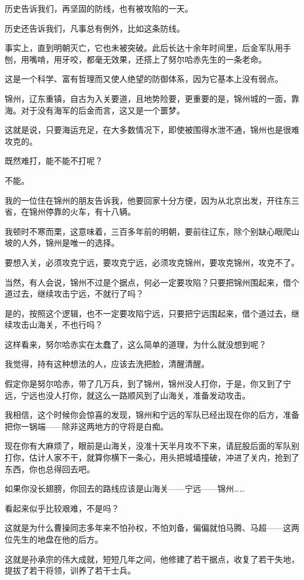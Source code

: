 \begin{multicols}{\theparacolNo}
历史告诉我们，再坚固的防线，也有被攻陷的一天。

历史还告诉我们，凡事总有例外，比如这条防线。

事实上，直到明朝灭亡，它也未被突破。此后长达十余年时间里，后金军队用手刨，用嘴啃，用牙咬，都毫无效果，还搭上了努尔哈赤先生的一条老命。

这是一个科学、富有哲理而又使人绝望的防御体系，因为它基本上没有弱点。

锦州，辽东重镇，自古为入关要道，且地势险要，更重要的是，锦州城的一面，靠海。对于没有海军的后金而言，这又是一个噩梦。

这就是说，只要海运充足，在大多数情况下，即使被围得水泄不通，锦州也是很难攻克的。

既然难打，能不能不打呢？

不能。

我的一位住在锦州的朋友告诉我，他要回家十分方便，因为从北京出发，开往东三省，在锦州停靠的火车，有十八辆。

我顿时不寒而栗，这意味着，三百多年前的明朝，要前往辽东，除个别缺心眼爬山坡的人外，锦州是唯一的选择。

要想入关，必须攻克宁远，要攻克宁远，必须攻克锦州，要攻克锦州，攻克不了。

当然，有人会说，锦州不过是个据点，何必一定要攻陷？只要把锦州围起来，借个道过去，继续攻击宁远，不就行了吗？

是的，按照这个逻辑，也不一定要攻陷宁远，只要把宁远围起来，借个道过去，继续攻击山海关，不也行吗？

这样看来，努尔哈赤实在太蠢了，这么简单的道理，为什么就没想到呢？

我觉得，持有这种想法的人，应该去洗把脸，清醒清醒。

假定你是努尔哈赤，带了几万兵，到了锦州，锦州没人打你，于是，你又到了宁远，宁远也没人打你，就这么一路顺风到了山海关，准备发动攻击。

我相信，这个时候你会惊喜的发现，锦州和宁远的军队已经出现在你的后方，准备把你一锅端——除非这两地方的守将是白痴。

现在你有大麻烦了，眼前是山海关，没准十天半月攻不下来，请屁股后面的军队别打你，估计人家不干，就算你横下一条心，用头把城墙撞破，冲进了关内，抢到了东西，你也总得回去吧。

如果你没长翅膀，你回去的路线应该是山海关——宁远——锦州……

看起来似乎比较艰难，不是吗？

这就是为什么曹操同志多年来不怕孙权，不怕刘备，偏偏就怕马腾、马超——这两位先生的地盘在他的后方。

这就是孙承宗的伟大成就，短短几年之间，他修建了若干据点，收复了若干失地，提拔了若干将领，训养了若干士兵。


\end{multicols}
